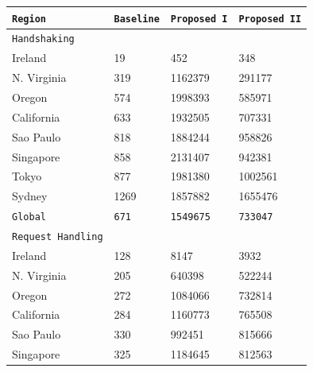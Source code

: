 \documentclass{uvamscse}
\begin{document}
\begin{table}[h]
\begin{center}
\begin{tabular}{llll}
  \texttt{Region}               & \texttt{Baseline}   & \texttt{Proposed I}  & \texttt{Proposed II}  \\
  \hline
  \texttt{Handshaking} \\
  Ireland                       & 19                  & 452                  & 348                 \\
  N. Virginia                   & 319                 & 1162379              & 291177                 \\
  Oregon                        & 574                 & 1998393              & 585971                 \\
  California                    & 633                 & 1932505              & 707331                 \\
  Sao Paulo                     & 818                 & 1884244              & 958826                 \\
  Singapore                     & 858                 & 2131407              & 942381                 \\
  Tokyo                         & 877                 & 1981380              & 1002561                 \\
  Sydney                        & 1269                & 1857882              & 1655476                 \\
  \texttt{Global}               & \texttt{671}        & \texttt{1549675}     & \texttt{733047}                 \\
  \hline
  \texttt{Request Handling} \\
  Ireland                       & 128                 & 8147                 & 3932                 \\
  N. Virginia                   & 205                 & 640398               & 522244                 \\
  Oregon                        & 272                 & 1084066              & 732814                 \\
  California                    & 284                 & 1160773              & 765508                 \\
  Sao Paulo                     & 330                 & 992451               & 815666                 \\
  Singapore                     & 325                 & 1184645              & 812563                 \\

\end{tabular}
\end{center}
\end{table}
\end{document}
